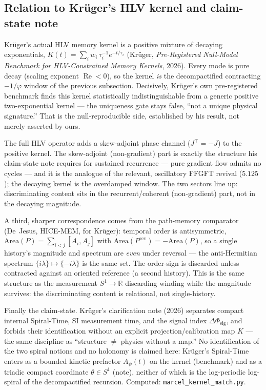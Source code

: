 \subsection{Relation to Kr\"uger's HLV kernel and claim-state note}
Kr\"uger's actual HLV memory kernel is a positive mixture of decaying exponentials,
$K(t)=\sum_i w_i\,\tau_i^{-1}e^{-t/\tau_i}$ (Kr\"uger, \emph{Pre-Registered Null-Model Benchmark
for HLV-Constrained Memory Kernels}, 2026). Every mode is pure decay (scaling exponent
$\operatorname{Re}<0$), so the kernel \emph{is} the decompactified contracting $-1/\varphi$ window
of the previous subsection. Decisively, Kr\"uger's own pre-registered benchmark finds this kernel
statistically indistinguishable from a generic positive two-exponential kernel --- the uniqueness
gate stays false, \enquote{not a unique physical signature.} That is the null-reproducible side,
established by his result, not merely asserted by ours.

The full HLV operator adds a skew-adjoint phase channel ($J^\top=-J$) to the positive kernel. The
skew-adjoint (non-gradient) part is exactly the structure his claim-state note requires for
sustained recurrence --- pure gradient flow admits no cycles --- and it is the analogue of the
relevant, oscillatory FFGFT revival ($5.125$); the decaying kernel is the overdamped window. The
two sectors line up: discriminating content sits in the recurrent/coherent (non-gradient) part,
not in the decaying magnitude.

A third, sharper correspondence comes from the path-memory comparator (De~Jesus, HICE-MEM, for
Kr\"uger): temporal order is antisymmetric, $\mathrm{Area}(P)=\sum_{i<j}[A_i,A_j]$ with
$\mathrm{Area}(P^{\mathrm{rev}})=-\mathrm{Area}(P)$, so a single history's magnitude and spectrum
are \emph{even} under reversal --- the anti-Hermitian spectrum $\{i\lambda\}\mapsto\{-i\lambda\}$
is the same set. The order-sign is discarded unless contracted against an oriented reference (a
second history). This is the same structure as the measurement $S^1\to\mathbb{R}$ discarding
winding while the magnitude survives: the discriminating content is relational, not single-history.

Finally the claim-state. Kr\"uger's clarification note (2026) separates compact internal
Spiral-Time, SI measurement time, and the signal index $\Delta\Phi_{\mathrm{sig}}$, and forbids
their identification without an explicit projection/calibration map $K$ --- the same discipline as
\enquote{structure $\neq$ physics without a map.} No identification of the two spiral notions and
no holonomy is claimed here: Kr\"uger's Spiral-Time enters as a bounded kinetic prefactor
$A_\psi(t)$ on the kernel (benchmark) and as a triadic compact coordinate $\theta\in S^1$ (note),
neither of which is the log-periodic log-spiral of the decompactified recursion. Computed:
\texttt{marcel\_kernel\_match.py}.

